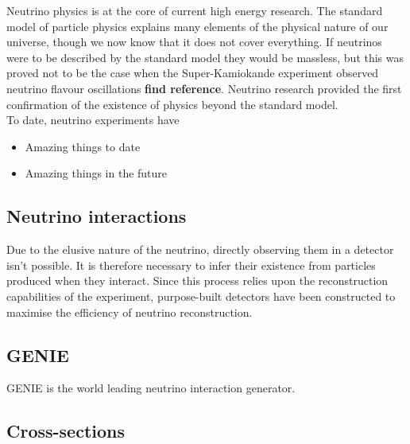 

    Neutrino physics is at the core of current high energy research. The standard model of particle physics explains many elements of the physical nature of our universe, though we now know that it does not cover everything. If neutrinos were to be described by the standard model they would be massless, but this was proved not to be the case when the Super-Kamiokande experiment observed neutrino flavour oscillations \textbf{find reference}. Neutrino research provided the first confirmation of the existence of physics beyond the standard model. \\

To date, neutrino experiments have 


    \begin{itemize}

        \item Amazing things to date
        \item Amazing things in the future
    
    \end{itemize}


\subsection{Neutrino interactions}

Due to the elusive nature of the neutrino, directly observing them in a detector isn't possible. It is therefore necessary to infer their existence from particles produced when they interact. Since this process relies upon the reconstruction capabilities of the experiment, purpose-built detectors have been constructed to maximise the efficiency of neutrino reconstruction. \\




\subsection{GENIE}

    GENIE is the world leading neutrino interaction generator. 

\subsection{Cross-sections}
    
